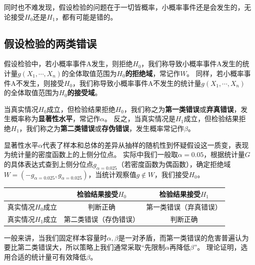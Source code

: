 同时也不难发现，假设检验的问题在于一切皆概率，小概率事件还是会发生的，无论接受$H_0$还是$H_1$，都有可能是错的。

\subsection{假设检验的两类错误}

\begin{definition}[拒绝域和接受域]
假设检验中，若小概率事件A发生，则拒绝$H_0$，我们称导致小概率事件A发生的统计量$g\left( X_1,\cdots ,X_n \right) $的全体取值范围为{\bf $H_0$的拒绝域}，常记作$W$。
同样，若小概率事件A不发生，则接受$H_0$，我们称导致小概率事件A不发生的统计量$g\left( X_1,\cdots ,X_n \right) $的全体取值范围为{\bf $H_0$的接受域}。
\end{definition}

\begin{definition}[两类错误]
当真实情况$H_0$成立，但检验结果拒绝$H_0$，我们称之为{\bf 第一类错误}或{\bf 弃真错误}，发生概率称为{\bf 显著性水平}，常记作$\alpha $。
反之，当真实情况是$H_1$成立，但检验结果拒绝$H_1$，我们称之为{\bf 第二类错误}或{\bf 存伪错误}，发生概率常记作$\beta $。
\end{definition}

显著性水平$\alpha $代表了样本和总体的差异从抽样的随机性到怀疑假设这一质变，表现为统计量的密度函数上的上侧分位点。
实际中我们一般取$\alpha =0.05$，根据统计量$G$的具体表达式查到上侧分位点$g_{\alpha =0.025}$（若密度函数为偶函数），确定拒绝域$W=\left( -g_{\alpha =0.025},g_{\alpha =0.025} \right) $，当统计观察值$g\notin W$，我们接受$H_0$。

\begin{table}[h]
\centering
\begin{tabular}{ccc}
    \toprule
    & 检验结果接受$H_0$ & 检验结果接受$H_1$\\
    \midrule
    真实情况$H_0$成立 & 判断正确 & 第一类错误（弃真错误）\\
    真实情况$H_1$成立 &  第二类错误（存伪错误） & 判断正确\\
    \bottomrule
\end{tabular}
\end{table}

一般来讲，当我们固定样本容量时$\alpha ,\beta $是一对矛盾，而第一类错误的危害普遍认为要比第二类错误大，所以策略上我们通常采取“先限制$\alpha $再降低$\beta $”。
理论证明，选用合适的统计量可有效降低$\beta $。

